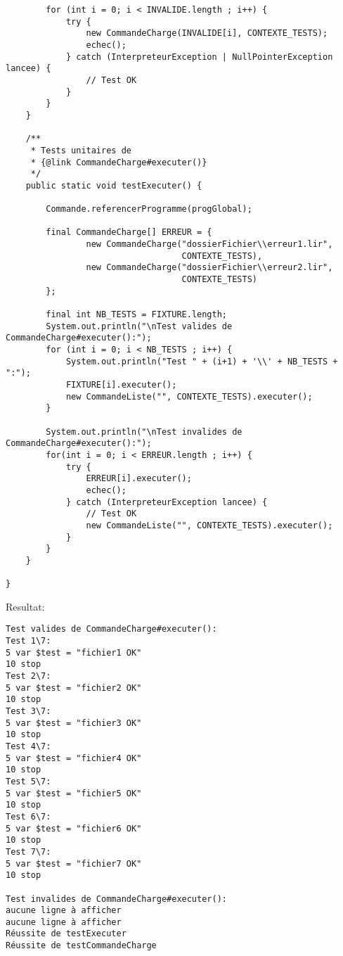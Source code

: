 \begin{enum}
\begin{verbatim}
        for (int i = 0; i < INVALIDE.length ; i++) {
            try {
                new CommandeCharge(INVALIDE[i], CONTEXTE_TESTS);
                echec();
            } catch (InterpreteurException | NullPointerException lancee) {
                // Test OK
            }
        }
    }
    
    /**
     * Tests unitaires de
     * {@link CommandeCharge#executer()}
     */
    public static void testExecuter() {
        
        Commande.referencerProgramme(progGlobal);
        
        final CommandeCharge[] ERREUR = {
                new CommandeCharge("dossierFichier\\erreur1.lir",
                                   CONTEXTE_TESTS),
                new CommandeCharge("dossierFichier\\erreur2.lir",
                                   CONTEXTE_TESTS)
        };
        
        final int NB_TESTS = FIXTURE.length;
        System.out.println("\nTest valides de CommandeCharge#executer():");
        for (int i = 0; i < NB_TESTS ; i++) {
            System.out.println("Test " + (i+1) + '\\' + NB_TESTS + ":");
            FIXTURE[i].executer();
            new CommandeListe("", CONTEXTE_TESTS).executer();
        }
        
        System.out.println("\nTest invalides de CommandeCharge#executer():");
        for(int i = 0; i < ERREUR.length ; i++) {
            try {
                ERREUR[i].executer();
                echec();
            } catch (InterpreteurException lancee) {
                // Test OK
                new CommandeListe("", CONTEXTE_TESTS).executer();
            }
        }
    }

}
\end{verbatim}
Resultat:
\begin{verbatim}
Test valides de CommandeCharge#executer():
Test 1\7:
5 var $test = "fichier1 OK"
10 stop
Test 2\7:
5 var $test = "fichier2 OK"
10 stop
Test 3\7:
5 var $test = "fichier3 OK"
10 stop
Test 4\7:
5 var $test = "fichier4 OK"
10 stop
Test 5\7:
5 var $test = "fichier5 OK"
10 stop
Test 6\7:
5 var $test = "fichier6 OK"
10 stop
Test 7\7:
5 var $test = "fichier7 OK"
10 stop

Test invalides de CommandeCharge#executer():
aucune ligne à afficher
aucune ligne à afficher
Réussite de testExecuter
Réussite de testCommandeCharge
\end{verbatim}


\end{enum}
